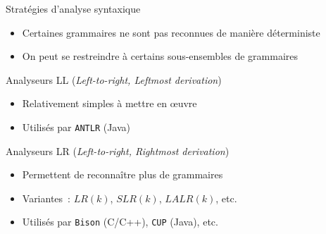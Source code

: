 
\begingroup

\begin{frame}{Stratégies d’analyse syntaxique}

  \begin{itemize}
    \item Certaines grammaires ne sont pas reconnues de manière déterministe
    \item On peut se restreindre à certains sous-ensembles de grammaires
  \end{itemize}

  \begin{block}{Analyseurs LL (\emph{Left-to-right, Leftmost derivation})}
    \begin{itemize}
      \item Relativement simples à mettre en œuvre
      \item Utilisés par \texttt{ANTLR} (Java)
    \end{itemize}
  \end{block}

  \begin{block}{Analyseurs LR (\emph{Left-to-right, Rightmost derivation})}
    \begin{itemize}
      \item Permettent de reconnaître plus de grammaires
      \item Variantes : $LR(k)$, $SLR(k)$, $LALR(k)$, etc.
      \item Utilisés par \texttt{Bison} (C/C++), \texttt{CUP} (Java), etc.
    \end{itemize}
  \end{block}

\end{frame}

\endgroup
